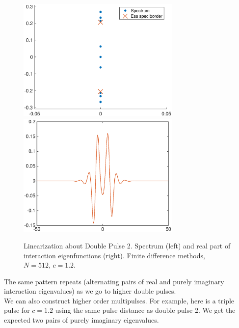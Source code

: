 \documentclass[12pt]{article}
\begin{document}
\begin{figure}[H]
\centering
\includegraphics[width=8cm]{spec12_double2.eps}
\includegraphics[width=8cm]{evecs12_double2real.eps}
\caption{Linearization about Double Pulse 2. Spectrum (left) and real part of interaction eigenfunctions (right). Finite difference methods, $N = 512$, $c = 1.2$.}
\end{figure}

The same pattern repeats (alternating pairs of real and purely imaginary interaction eigenvalues) as we go to higher double pulses.\\

We can also construct higher order multipulses. For example, here is a triple pulse for $c = 1.2$ using the same pulse distance as double pulse 2. We get the expected two pairs of purely imaginary eigenvalues.
\end{document}
